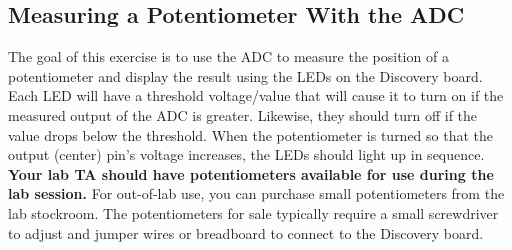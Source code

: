 \documentclass[openany,11pt,fleqn]{book} %
\begin{document}
\subsection{Measuring a Potentiometer With the ADC}
The goal of this exercise is to use the ADC to measure the position of a potentiometer and display the result using the LEDs on the Discovery board. Each LED will have a threshold voltage/value that will cause it to turn on if the measured output of the ADC is greater. Likewise, they should turn off if the value drops below the threshold. When the potentiometer is turned so that the output (center) pin's voltage increases, the LEDs should light up in sequence. \\ 

\textbf{Your lab TA should have potentiometers available for use during the lab session.} For out-of-lab use, you can purchase small potentiometers from the lab stockroom. The potentiometers for sale typically require a small screwdriver to adjust and jumper wires or breadboard to connect to the Discovery board. 
\end{document}

